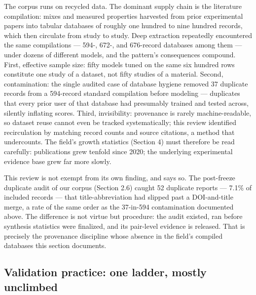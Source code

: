 \documentclass[pdflatex,sn-basic]{sn-jnl}
\begin{document}
The corpus runs on recycled data. The dominant supply chain is the literature compilation: mixes and measured properties harvested from prior experimental papers into tabular databases of roughly one hundred to nine hundred records, which then circulate from study to study. Deep extraction repeatedly encountered the same compilations --- 594-, 672-, and 676-record databases among them --- under dozens of different models, and the pattern's consequences compound. First, effective sample size: fifty models tuned on the same six hundred rows constitute one study of a dataset, not fifty studies of a material. Second, contamination: the single audited case of database hygiene removed 37 duplicate records from a 594-record standard compilation before modeling \citep{parakhiya2026} --- duplicates that every prior user of that database had presumably trained and tested across, silently inflating scores. Third, invisibility: provenance is rarely machine-readable, so dataset reuse cannot even be tracked systematically; this review identified recirculation by matching record counts and source citations, a method that undercounts. The field's growth statistics (Section 4) must therefore be read carefully: publications grew tenfold since 2020; the underlying experimental evidence base grew far more slowly.

This review is not exempt from its own finding, and says so. The post-freeze duplicate audit of our corpus (Section 2.6) caught 52 duplicate reports --- 7.1\% of included records --- that title-abbreviation had slipped past a DOI-and-title merge, a rate of the same order as the 37-in-594 contamination documented above. The difference is not virtue but procedure: the audit existed, ran before synthesis statistics were finalized, and its pair-level evidence is released. That is precisely the provenance discipline whose absence in the field's compiled databases this section documents.

\subsection{Validation practice: one ladder, mostly unclimbed}
\end{document}
